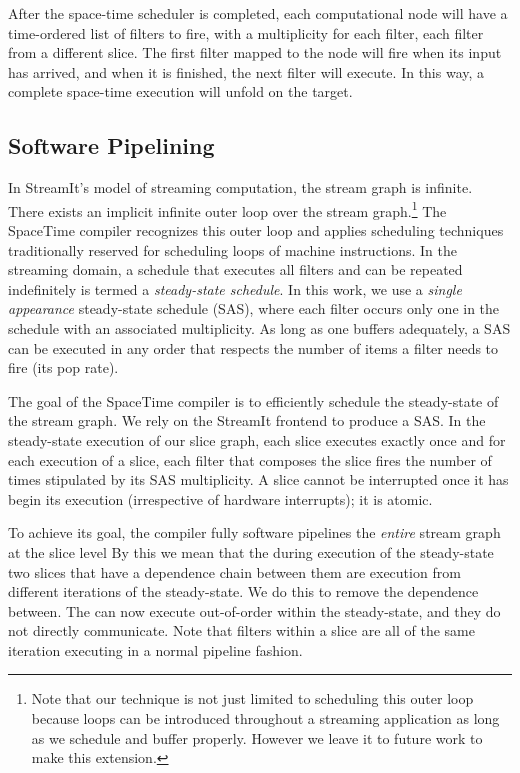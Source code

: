 After the space-time scheduler is completed, each computational node
will have a time-ordered list of filters to fire, with a multiplicity
for each filter, each filter from a different slice.  The first
filter mapped to the node will fire when its input has arrived, and
when it is finished, the next filter will execute.  In this way, a
complete space-time execution will unfold on the target.

\subsection{Software Pipelining}
\label{sec:softpipe}
In StreamIt's model of streaming computation, the stream graph is
infinite.  There exists an implicit infinite outer loop over the
stream graph.\footnote{Note that our technique is not just limited to
scheduling this outer loop because loops can be introduced throughout
a streaming application as long as we schedule and buffer properly.
However we leave it to future work to make this extension.}  The
SpaceTime compiler recognizes this outer loop and applies scheduling
techniques traditionally reserved for scheduling loops of machine
instructions.  In the streaming domain, a schedule that executes all
filters and can be repeated indefinitely is termed a {\it steady-state
schedule}.  In this work, we use a {\it single appearance}
steady-state schedule (SAS), where each filter occurs only one in the
schedule with an associated multiplicity.  As long as one buffers
adequately, a SAS can be executed in any order that respects the
number of items a filter needs to fire (its pop rate).

The goal of the SpaceTime compiler is to efficiently schedule the
steady-state of the stream graph.  We rely on the StreamIt frontend to
produce a SAS.  In the steady-state execution of our slice graph, each
slice executes exactly once and for each execution of a slice, each
filter that composes the slice fires the number of times stipulated
by its SAS multiplicity.  A slice cannot be interrupted once it has
begin its execution (irrespective of hardware interrupts); it is
atomic.

To achieve its goal, the compiler fully software pipelines the {\it
entire} stream graph at the slice level By this we mean that the
during execution of the steady-state two slices that have a dependence
chain between them are execution from different iterations of the
steady-state.  We do this to remove the dependence between.  The can
now execute out-of-order within the steady-state, and they do not
directly communicate.  Note that filters within a slice are all of the
same iteration executing in a normal pipeline fashion.  

